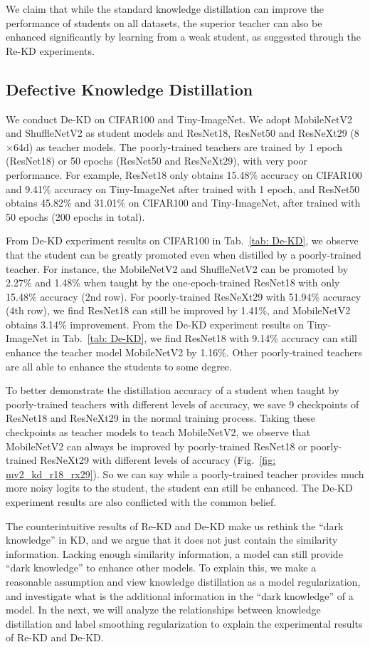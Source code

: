 \documentclass[10pt,twocolumn,letterpaper]{article}
\begin{document}
We claim that while the standard knowledge distillation can improve the performance of students on all datasets, the superior teacher can also be enhanced significantly by learning from a weak student, as suggested through the Re-KD experiments. 


\subsection{Defective Knowledge Distillation}
We conduct De-KD on CIFAR100 and Tiny-ImageNet. We adopt MobileNetV2 and ShuffleNetV2 as student models and ResNet18, ResNet50 and ResNeXt29 (8$\times$64d) as teacher models. The poorly-trained teachers are trained by 1 epoch (ResNet18) or 50 epochs (ResNet50 and ResNeXt29), with very poor performance. For example, ResNet18 only obtains 15.48\% accuracy on CIFAR100 and 9.41\% accuracy on Tiny-ImageNet after trained with 1 epoch, and ResNet50 obtains 45.82\% and 31.01\% on CIFAR100 and Tiny-ImageNet, after trained with 50 epochs (200 epochs in total).

From De-KD experiment results on CIFAR100 in Tab.~\ref{tab: De-KD}, we observe that the student can be greatly promoted even when distilled by a poorly-trained teacher. For instance, the MobileNetV2 and ShuffleNetV2 can be promoted by 2.27\% and 1.48\% when taught by the one-epoch-trained ResNet18 with only 15.48\% accuracy (2nd row). For poorly-trained ResNeXt29 with 51.94\% accuracy (4th row), we find ResNet18 can still be improved by 1.41\%, and MobileNetV2 obtains 3.14\% improvement. From the De-KD experiment results on Tiny-ImageNet in Tab.~\ref{tab: De-KD}, we find ResNet18 with 9.14\% accuracy can still enhance the teacher model MobileNetV2 by 1.16\%. Other poorly-trained teachers are all able to enhance the students to some degree.


To better demonstrate the distillation accuracy of a student when taught by poorly-trained teachers with different levels of accuracy, we save 9 checkpoints of ResNet18 and ResNeXt29 in the normal training process. Taking these checkpoints as teacher models to teach MobileNetV2, we observe that MobileNetV2 can always be improved by poorly-trained ResNet18 or poorly-trained ResNeXt29 with different levels of accuracy (Fig.~\ref{fig: mv2_kd_r18_rx29}). So we can say while a poorly-trained teacher provides much more noisy logits to the student, the student can still be enhanced. The De-KD experiment results are also conflicted with the common belief.

The counterintuitive results of Re-KD and De-KD make us rethink the ``dark knowledge'' in KD, and we argue that it does not just contain the similarity information. Lacking enough similarity information, a model can still provide ``dark knowledge'' to enhance other models.  To explain this, we make a reasonable assumption and view knowledge distillation as a model regularization, and investigate what is the additional information in the ``dark knowledge'' of a model. In the next, we will analyze the relationships between knowledge distillation and label smoothing regularization to explain the experimental results of Re-KD and De-KD. 
\end{document}
